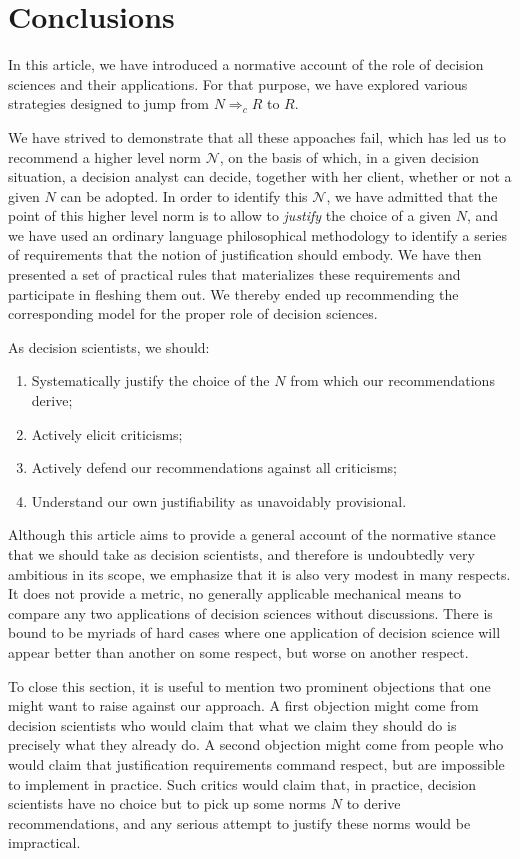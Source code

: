 \documentclass[preprint, french, english, 11pt, authoryear]{elsarticle}%
\newcommand{\adv}{\mathscr{N}}
\begin{document}
\section{Conclusions}
In this article, we have introduced a normative account of the role of decision sciences and their applications. For that purpose, we have explored various strategies designed  to jump from $N ⇒_c R$ to $R$.

We have strived to demonstrate that all these appoaches fail, which has led us to recommend a higher level norm $\adv$, on the basis of which, in a given decision situation, a decision analyst can decide, together with her client, whether or not a given $N$ can be adopted. In order to identify this $\adv$, we have admitted that the point of this higher level norm is to allow to \emph{justify} the choice of a given $N$, and we have used an ordinary language philosophical methodology to identify a series of requirements that the notion of justification should embody. We have then presented a set of practical rules that materializes these requirements and participate in fleshing them out. We thereby ended up recommending the corresponding model for the proper role of decision sciences.

As decision scientists, we should:
\begin{enumerate}[label=\roman*.]
	\item Systematically justify the choice of the $N$ from which our recommendations derive;
	\item Actively elicit criticisms;
	\item Actively defend our recommendations against all criticisms;
	\item Understand our own justifiability as unavoidably provisional.
\end{enumerate}

Although this article aims to provide a general account of the normative stance that we should take as decision scientists, and therefore is undoubtedly very ambitious in its scope, we emphasize that it is also very modest in many respects. It does not provide a metric, no generally applicable mechanical means to compare any two applications of decision sciences without discussions. There is bound to be myriads of hard cases where one application of decision science will appear better than another on some respect, but worse on another respect.

To close this section, it is useful to mention two prominent objections that one might want to raise against our approach.
A first objection might come from decision scientists who would claim that what we claim they should do is precisely what they already do. 
A second objection might come from people who would claim that justification requirements command respect, but are impossible to implement in practice. Such critics would claim that, in practice, decision scientists have no choice but to pick up some norms $N$ to derive recommendations, and any serious attempt to justify these norms would be impractical.
\end{document}
